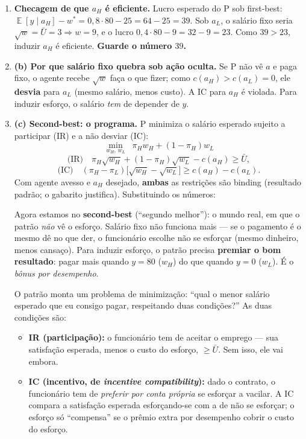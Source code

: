 \documentclass[11pt,a4paper]{article}
\DeclareMathOperator{\Esp}{\mathbb{E}}
\newcommand{\dc}[2]{#1{,}#2}
\begin{document}
\begin{enumerate}[leftmargin=2em,itemsep=4pt]
\item \textbf{Checagem de que $a_H$ é eficiente.} Lucro esperado do P sob first-best:
$\Esp[y\mid a_H] - w^\ast = \dc{0}{8}\cdot 80 - 25 = 64 - 25 = 39$. Sob $a_L$, o salário
fixo seria $\sqrt{w} = \bar U = 3 \Rightarrow w = 9$, e o lucro
$\dc{0}{4}\cdot 80 - 9 = 32 - 9 = 23$. Como $39 > 23$, induzir $a_H$ é eficiente.
\textbf{Guarde o número $39$.}

\item \textbf{(b) Por que salário fixo quebra sob ação oculta.} Se P não vê $a$ e paga
fixo, o agente recebe $\sqrt{w}$ faça o que fizer; como $c(a_H) > c(a_L)=0$, ele
\textbf{desvia} para $a_L$ (mesmo salário, menos custo). A IC para $a_H$ é violada. Para
induzir esforço, o salário \emph{tem} de depender de $y$.

\item \textbf{(c) Second-best: o programa.} P minimiza o salário esperado sujeito a
participar (IR) e a não desviar (IC):
\[
\min_{w_H,\,w_L}\;\; \pi_H w_H + (1-\pi_H) w_L
\]
\[
\text{(IR)}\quad \pi_H\sqrt{w_H} + (1-\pi_H)\sqrt{w_L} - c(a_H) \ge \bar U,
\]
\[
\text{(IC)}\quad (\pi_H - \pi_L)\big[\sqrt{w_H} - \sqrt{w_L}\big] \ge c(a_H) - c(a_L).
\]
Com agente avesso e $a_H$ desejado, \textbf{ambas} as restrições são binding (resultado
padrão; o gabarito justifica). Substituindo os números:

\begin{empalavras}
Agora estamos no \textbf{second-best} (``segundo melhor''): o mundo real, em que o patrão
\emph{não} vê o esforço. Salário fixo não funciona mais — se o pagamento é o mesmo dê no que
der, o funcionário escolhe não se esforçar (mesmo dinheiro, menos cansaço). Para induzir
esforço, o patrão precisa \textbf{premiar o bom resultado}: pagar mais quando $y = 80$
($w_H$) do que quando $y = 0$ ($w_L$). É o \emph{bônus por desempenho}.

\smallskip\noindent
O patrão monta um problema de minimização: ``qual o menor salário esperado que eu consigo
pagar, respeitando duas condições?'' As duas condições são:
\begin{itemize}[leftmargin=1.3em,itemsep=1pt,topsep=2pt]
\item \textbf{IR (participação):} o funcionário tem de aceitar o emprego — sua satisfação
esperada, menos o custo do esforço, $\ge \bar U$. Sem isso, ele vai embora.
\item \textbf{IC (incentivo, de \emph{incentive compatibility}):} dado o contrato, o
funcionário tem de \emph{preferir por conta própria} se esforçar a vacilar. A IC compara a
satisfação esperada esforçando-se com a de não se esforçar; o esforço só ``compensa'' se o
prêmio extra por desempenho cobrir o custo do esforço.
\end{itemize}


\end{empalavras}
\end{enumerate}
\end{document}
